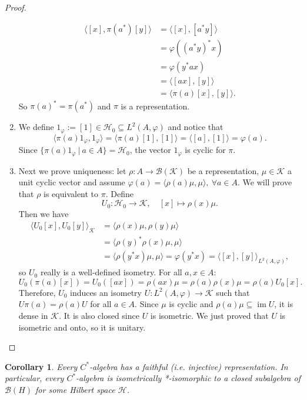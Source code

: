 \documentclass[10pt, a4paper]{article}
\newtheorem{corollary}[thm]{Corollary}
\newenvironment{noticeC}{%
  \tcolorbox[%
  notitle,
  empty,
  enhanced,  %
  breakable,
  coltext=black, 
  fontupper=\rmfamily,
  noparskip,
  sharp corners,
  boxrule=-1pt,  %
  frame hidden,
  left=7pt,  %
  right=7pt,
  top=5pt,
  bottom=5pt,
  before skip=2.5ex plus 2pt,
  after skip=2.5ex plus 2pt,
  overlay unbroken and last={%
  },
  ]}
{\endtcolorbox}
\newenvironment{myproof}%
  {\begin{noticeC}\begin{proof}}%
  {\end{proof}\end{noticeC}}
\DeclareMathOperator{\im}{im}
\begin{document}
\begin{myproof}
\begin{enumerate}
\begin{align*}
      \langle [x] , \pi(a^*) [y]\rangle &= \langle [x], [a^* y]\rangle\\
      &= \varphi((a^* y)^* x)\\
      &= \varphi(y^* ax)\\
      &= \langle [ax], [y] \rangle\\
      &= \langle \pi(a) [x], [y]\rangle.
    \end{align*}
    So $\pi(a) ^* = \pi(a^*)$ and $\pi$ is a representation.
    \item We define $1_\varphi := [1] \in \mathcal{H}_0 \subseteq L^2 (A, \varphi)$
    and notice that 
    $$\langle \pi(a) 1_\varphi, 1_\varphi \rangle = \langle \pi(a) [1], [1] \rangle = \langle[a], [1] \rangle = \varphi(a).$$
    Since $\{\pi (a) 1_\varphi\ |\ a \in A\} = \mathcal{H}_0$, the vector $1_\varphi$ is cyclic for $\pi$.
    \item Next we prove uniqueness: let $\rho: A \to \mathcal{B} (\mathcal{K})$ be a representation, $\mu \in \mathcal{K}$ a unit cyclic vector and 
    assume $\varphi(a) = \langle \rho(a)\mu, \mu\rangle,\ \forall a \in A$.
    We will prove that $\rho$ is equivalent to $\pi$. Define 
    $$U_0 : \mathcal{H}_0 \to \mathcal{K},\quad [x] \mapsto \rho(x) \mu.$$
    Then we have 
    \begin{align*}
      \langle U_0 [x], U_0 [y] \rangle_{\mathcal{K}} &= \langle \rho (x) \mu, \rho(y) \mu \rangle\\
      &= \langle \rho(y) ^* \rho(x)\mu, \mu \rangle\\
      &= \langle \rho (y^* x) \mu, \mu\rangle = \varphi(y^* x) = \langle [x], [y] \rangle_{L^2 (A, \varphi)},
    \end{align*}
    so $U_0$ really is a well-defined isometry. For all $a, x \in A$:
    $$U_0 (\pi (a) [x]) = U_0 ([ax]) = \rho (ax) \mu = \rho(a) \rho(x) \mu = \rho(a) U_0 [x].$$
    Therefore, $U_0$ induces an isometry $U: L^2 (A, \varphi) \to \mathcal{K}$
    such that $U\pi(a) = \rho (a) U$ for all $a \in A$. Since $\mu$ is cyclic and $\rho(a) \mu \subseteq \im U$, it is dense in $\mathcal{K}$.
    It is also closed since $U$ is isometric. We just proved that $U$ is isometric and onto, so it is unitary. \qedhere
  \end{enumerate}
\end{myproof}

\begin{corollary}
  Every $C^*$-algebra has a faithful (i.e. injective) representation. In particular, every $C^*$-algebra is isometrically *-isomorphic to a closed subalgebra of $\mathcal{B} (H)$
  for some Hilbert space $\mathcal{H}$.
\end{corollary}
\end{document}
